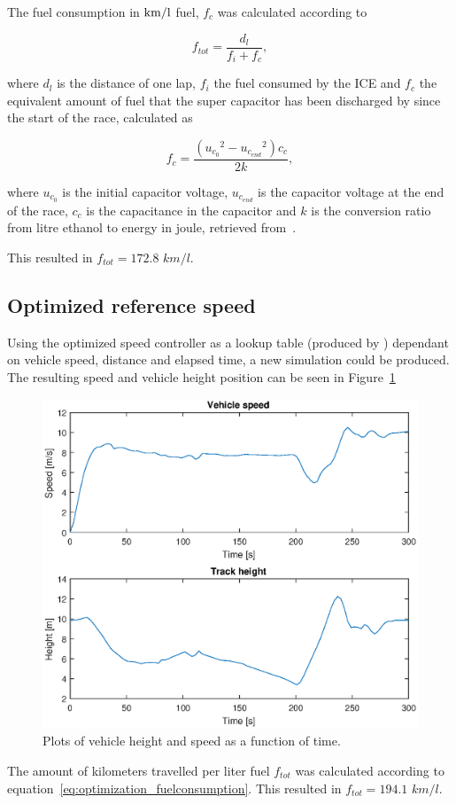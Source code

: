 The fuel consumption in $\textnormal{km/l}$ fuel, $f_c$ was calculated according to

\begin{equation} \label{eq:optimization_fuelconsumption}
	f_{tot} = \frac{d_l}{f_i+f_c},
\end{equation}

where $d_l$ is the distance of one lap, $f_i$ the fuel consumed by the ICE and
$f_c$ the equivalent amount of fuel that the super capacitor has been discharged
by since the start of the race, calculated as

\begin{equation} \label{eq:optimization_ethanolenergy}
	f_c = \frac{({{u_{c_0}}^2-{u_{c_{end}}}^2})c_c}{2k},
\end{equation}

where $u_{c_0}$ is the initial capacitor voltage, $u_{c_{end}}$ is the capacitor
voltage at the end of the race, $c_c$ is the capacitance in the capacitor and
$k$ is the conversion ratio from litre ethanol to energy in joule, retrieved
from~\cite{fuelconversion}.

This resulted in $f_{tot} = 172.8$ $km/l$. %

\subsection{Optimized reference speed}\label{sec:opt_sim_static}
Using the optimized speed controller as a lookup table (produced by
\citep{liu2016}) dependant on vehicle speed, distance and elapsed time, a new
simulation could be produced. The resulting speed and vehicle height position
can be seen in Figure~\ref{fig:optimization_optimal_speed}

\begin{figure}[H]
    \centering
    \includegraphics[width=\textwidth]{./img/optimization_optimal_speed.eps}
    \caption{Plots of vehicle height and speed as a function of
    time.}\label{fig:optimization_optimal_speed}
\end{figure}

The amount of kilometers travelled per liter fuel $f_{tot}$ was calculated
according to equation~\ref{eq:optimization_fuelconsumption}. This resulted in
$f_{tot} = 194.1$ $km/l$. %
